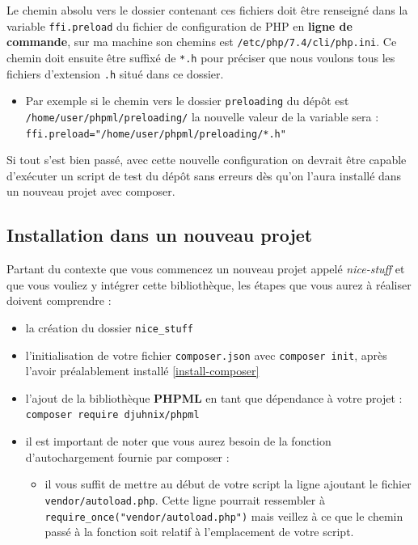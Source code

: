 \documentclass[11pt,a4paper,krantz2,11pt,oneside]{krantz}
\providecommand{\tightlist}{%
  \setlength{\itemsep}{0pt}\setlength{\parskip}{0pt}}
\begin{document}
Le chemin absolu vers le dossier contenant ces fichiers doit être renseigné dans la variable \texttt{ffi.preload} du fichier de configuration de PHP en \textbf{ligne de commande}, sur ma machine son chemins est \texttt{/etc/php/7.4/cli/php.ini}. Ce chemin doit ensuite être suffixé de \texttt{*.h} pour préciser que nous voulons tous les fichiers d'extension \texttt{.h} situé dans ce dossier.

\begin{itemize}
\tightlist
\item
  Par exemple si le chemin vers le dossier \texttt{preloading} du dépôt est \texttt{/home/user/phpml/preloading/} la nouvelle valeur de la variable sera : \texttt{ffi.preload="/home/user/phpml/preloading/*.h"}
\end{itemize}

Si tout s'est bien passé, avec cette nouvelle configuration on devrait être capable d'exécuter un script de test du dépôt sans erreurs dès qu'on l'aura installé dans un nouveau projet avec composer.

\hypertarget{installation-dans-un-nouveau-projet}{%
\subsection{Installation dans un nouveau projet}\label{installation-dans-un-nouveau-projet}}

Partant du contexte que vous commencez un nouveau projet appelé \emph{nice-stuff} et que vous vouliez y intégrer cette bibliothèque, les étapes que vous aurez à réaliser doivent comprendre :

\begin{itemize}
\tightlist
\item
  la création du dossier \texttt{nice\_stuff}
\item
  l'initialisation de votre fichier \texttt{composer.json} avec \texttt{composer\ init}, après l'avoir préalablement installé \ref{install-composer}
\item
  l'ajout de la bibliothèque \textbf{PHPML} en tant que dépendance à votre projet : \texttt{composer\ require\ djuhnix/phpml}
\item
  il est important de noter que vous aurez besoin de la fonction d'autochargement fournie par composer :

  \begin{itemize}
  \tightlist
  \item
    il vous suffit de mettre au début de votre script la ligne ajoutant le fichier \texttt{vendor/autoload.php}. Cette ligne pourrait ressembler à \texttt{require\_once("vendor/autoload.php")} mais veillez à ce que le chemin passé à la fonction soit relatif à l'emplacement de votre script.
  \end{itemize}
\end{itemize}
\end{document}
